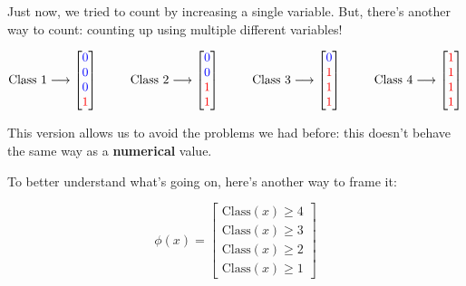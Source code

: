                 Just now, we tried to count by increasing a single variable. But, there's another way to count: counting up using multiple different variables!

                \begin{equation*}
                    \text{Class 1} \longrightarrow
                    \begin{bmatrix}
                        \textcolor{blue}{0} \\ \textcolor{blue}{0} \\ \textcolor{blue}{0} \\ \textcolor{red}{1}
                    \end{bmatrix}
                    \qquad \;\;
                    \text{Class 2} \longrightarrow
                    \begin{bmatrix}
                        \textcolor{blue}{0} \\ \textcolor{blue}{0} \\ \textcolor{red}{1} \\ \textcolor{red}{1}
                    \end{bmatrix}
                    \qquad \;\;
                    \text{Class 3} \longrightarrow
                    \begin{bmatrix}
                        \textcolor{blue}{0} \\ \textcolor{red}{1} \\ \textcolor{red}{1} \\ \textcolor{red}{1}
                    \end{bmatrix}
                    \qquad \;\;
                    \text{Class 4} \longrightarrow
                    \begin{bmatrix}
                        \textcolor{red}{1} \\ \textcolor{red}{1} \\ \textcolor{red}{1} \\ \textcolor{red}{1}
                    \end{bmatrix}
                \end{equation*}
                
                This version allows us to avoid the problems we had before: this doesn't behave the same way as a \textbf{numerical} value.

                To better understand what's going on, here's another way to frame it:

                \begin{equation}
                    \phi(x) =
                    \begin{bmatrix}
                        \text{Class}(x)\geq 4 \\
                        \text{Class}(x)\geq 3\\
                        \text{Class}(x)\geq 2\\
                        \text{Class}(x)\geq 1
                    \end{bmatrix}
                \end{equation}


